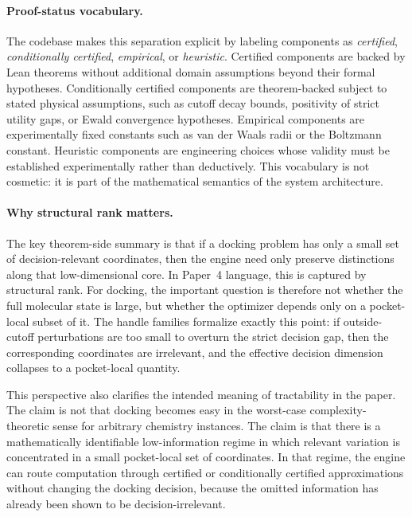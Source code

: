 \paragraph{Proof-status vocabulary.}
The codebase makes this separation explicit by labeling components as \emph{certified}, \emph{conditionally certified}, \emph{empirical}, or \emph{heuristic}. Certified components are backed by Lean theorems without additional domain assumptions beyond their formal hypotheses. Conditionally certified components are theorem-backed subject to stated physical assumptions, such as cutoff decay bounds, positivity of strict utility gaps, or Ewald convergence hypotheses. Empirical components are experimentally fixed constants such as van der Waals radii or the Boltzmann constant. Heuristic components are engineering choices whose validity must be established experimentally rather than deductively. This vocabulary is not cosmetic: it is part of the mathematical semantics of the system architecture.

\paragraph{Why structural rank matters.}
The key theorem-side summary is that if a docking problem has only a small set of decision-relevant coordinates, then the engine need only preserve distinctions along that low-dimensional core. In Paper~4 language, this is captured by structural rank. For docking, the important question is therefore not whether the full molecular state is large, but whether the optimizer depends only on a pocket-local subset of it. The handle families  formalize exactly this point: if outside-cutoff perturbations are too small to overturn the strict decision gap, then the corresponding coordinates are irrelevant, and the effective decision dimension collapses to a pocket-local quantity.

This perspective also clarifies the intended meaning of tractability in the paper. The claim is not that docking becomes easy in the worst-case complexity-theoretic sense for arbitrary chemistry instances. The claim is that there is a mathematically identifiable low-information regime in which relevant variation is concentrated in a small pocket-local set of coordinates. In that regime, the engine can route computation through certified or conditionally certified approximations without changing the docking decision, because the omitted information has already been shown to be decision-irrelevant.

